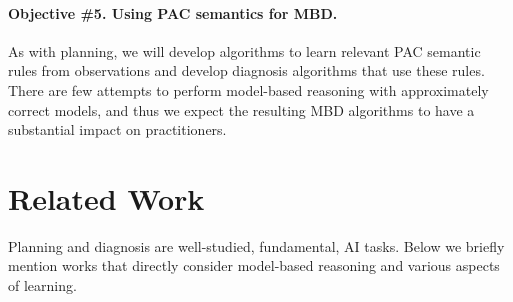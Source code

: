 \documentclass[12pt]{article}
\newcommand{\note}[1]{\textbf{\textit{#1}}}
\begin{document}

\vspace{-0.35cm}
\paragraph{Objective \#5. Using PAC semantics for MBD.} 
As with planning, we will develop algorithms to learn 
relevant PAC semantic rules from observations and develop diagnosis algorithms that use these rules. There are few attempts to perform model-based reasoning with approximately correct models, and thus we expect the resulting MBD algorithms to have a substantial impact on practitioners.  









\section{Related Work}
Planning and diagnosis are well-studied, fundamental, AI tasks. 
Below we briefly mention works that directly consider model-based reasoning and various aspects of learning. 
\end{document}
